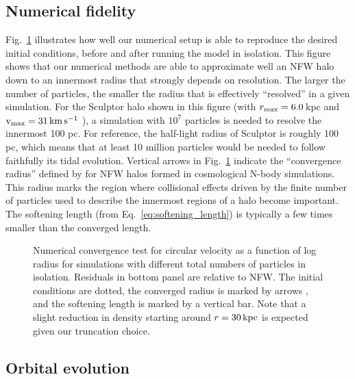 \subsection{Numerical fidelity}\label{numerical-fidelity}

Fig.~\ref{fig:numerical_convergence} illustrates how well our numerical
setup is able to reproduce the desired initial conditions, before and
after running the model in isolation. This figure shows that our
numerical methods are able to approximate well an NFW halo down to an
innermost radius that strongly depends on resolution. The larger the
number of particles, the smaller the radius that is effectively
``resolved'' in a given simulation. For the Sculptor halo shown in this
figure (with \(r_{\rm max} = 6.0\,\)kpc and \({\rm v}_{\rm max} = 31\,{\rm km\,s^{-1}}\) ), a
simulation with \(10^7\) particles is needed to resolve the innermost
100 pc. For reference, the half-light radius of Sculptor is roughly 100
pc, which means that at least 10 million particles would be needed to
follow faithfully its tidal evolution. Vertical arrows in
Fig.~\ref{fig:numerical_convergence} indicate the ``convergence radius''
defined by \citet[eq.\textasciitilde13]{power+2003} for NFW halos formed
in cosmological N-body simulations. This radius marks the region where
collisional effects driven by the finite number of particles used to
describe the innermost regions of a halo become important. The softening
length (from Eq.~\ref{eq:softening_length}) is typically a few times
smaller than the converged length.

\begin{figure}
\centering
{}
\caption[Numerical halo convergence]{Numerical convergence test for
circular velocity as a function of log radius for simulations with
different total numbers of particles in isolation. Residuals in bottom
panel are relative to NFW. The initial conditions are dotted, the
converged radius is marked by arrows \citep[from][ eq. 13]{power+2003},
and the softening length is marked by a vertical bar. Note that a slight
reduction in density starting around \(r = 30\,{\rm kpc}\) is expected given
our truncation choice.}\label{fig:numerical_convergence}
\end{figure}

\subsection{Orbital evolution}\label{orbital-evolution}

